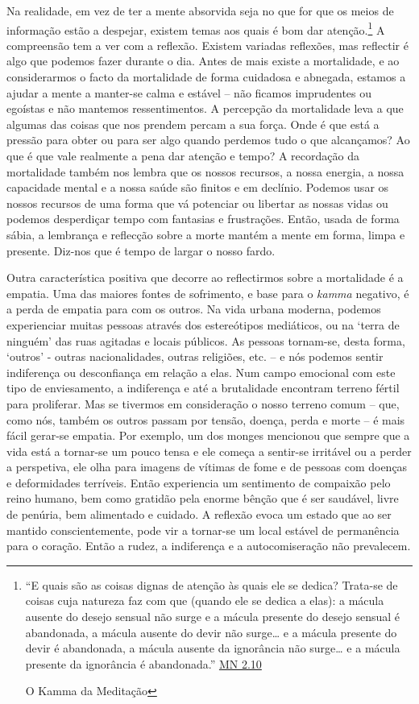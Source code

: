 Na realidade, em vez de ter a mente absorvida seja no que for que os meios de informação estão a despejar, existem temas aos quais é bom dar atenção.\footnote{``E quais são as coisas dignas de atenção às quais ele se dedica? Trata-se de coisas cuja natureza faz com que (quando ele se dedica a elas): a mácula ausente do desejo sensual não surge e a mácula presente do desejo sensual é abandonada, a mácula ausente do devir não surge\ldots{} e a mácula presente do devir é abandonada, a mácula ausente da ignorância não surge\ldots{} e a mácula presente da ignorância é abandonada.'' \href{https://suttacentral.net/mn2/en/bodhi}{MN 2.10}

  O Kamma da Meditação} A compreensão tem a ver com a reflexão. Existem variadas reflexões, mas reflectir é algo que podemos fazer durante o dia. Antes de mais existe a mortalidade, e ao considerarmos o facto da mortalidade de forma cuidadosa e abnegada, estamos a ajudar a mente a manter-se calma e estável -- não ficamos imprudentes ou egoístas e não mantemos ressentimentos. A percepção da mortalidade leva a que algumas das coisas que nos prendem percam a sua força. Onde é que está a pressão para obter ou para ser algo quando perdemos tudo o que alcançamos? Ao que é que vale realmente a pena dar atenção e tempo? A recordação da mortalidade também nos lembra que os nossos recursos, a nossa energia, a nossa capacidade mental e a nossa saúde são finitos e em declínio. Podemos usar os nossos recursos de uma forma que vá potenciar ou libertar as nossas vidas ou podemos desperdiçar tempo com fantasias e frustrações. Então, usada de forma sábia, a lembrança e reflecção sobre a morte mantém a mente em forma, limpa e presente. Diz-nos que é tempo de largar o nosso fardo.

Outra característica positiva que decorre ao reflectirmos sobre a mortalidade é a empatia. Uma das maiores fontes de sofrimento, e base para o \emph{kamma} negativo, é a perda de empatia para com os outros. Na vida urbana moderna, podemos experienciar muitas pessoas através dos estereótipos mediáticos, ou na `terra de ninguém' das ruas agitadas e locais públicos. As pessoas tornam-se, desta forma, `outros' - outras nacionalidades, outras religiões, etc. -- e nós podemos sentir indiferença ou desconfiança em relação a elas. Num campo emocional com este tipo de enviesamento, a indiferença e até a brutalidade encontram terreno fértil para proliferar. Mas se tivermos em consideração o nosso terreno comum -- que, como nós, também os outros passam por tensão, doença, perda e morte -- é mais fácil gerar-se empatia. Por exemplo, um dos monges mencionou que sempre que a vida está a tornar-se um pouco tensa e ele começa a sentir-se irritável ou a perder a perspetiva, ele olha para imagens de vítimas de fome e de pessoas com doenças e deformidades terríveis. Então experiencia um sentimento de compaixão pelo reino humano, bem como gratidão pela enorme bênção que é ser saudável, livre de penúria, bem alimentado e cuidado. A reflexão evoca um estado que ao ser mantido conscientemente, pode vir a tornar-se um local estável de permanência para o coração. Então a rudez, a indiferença e a autocomiseração não prevalecem.

